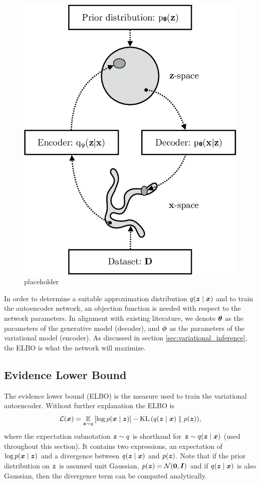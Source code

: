 \begin{figure}[H]
    \centering
    \includegraphics[width=0.6\linewidth]{report/figures/placeholder2.png}
    \caption{placeholder }
\end{figure}

In order to determine a suitable approximation distribution $q(\bm{ z } \mid \bm{ x })$ and to train the autoencoder network, an objection function is needed with respect to the network parameters. In alignment with existing literature, we denote $\bm{ \theta }$ as the parameters of the generative model (decoder), and $\bm{ \phi }$ as the parameters of the variational model (encoder). As discussed in section \ref{sec:variational_inference}, the ELBO is what the network will maximize.

\subsection{Evidence Lower Bound}
\label{sec:elbo}
The evidence lower bound (ELBO) is the measure used to train the variational autoencoder. Without further explanation the ELBO is
\begin{equation}
    \mathcal{L}(\bm{ x }) = \operatorname*{\mathbb{E}}_{\bm{ z }\sim q}{\mathopen{} \left[ \log p(\bm{ x } \mid \bm{ z }) \right] \mathclose{}} - \operatorname{KL}{\mathopen{} \left(q(\bm{ z } \mid \bm{ x }) \parallel p(\bm{ z })\right) \mathclose{}}\label{eq:elbo},
\end{equation}
where the expectation subnotation $\bm{ z } \sim q$ is shorthand for $\bm{ z } \sim q(\bm{ z } \mid \bm{ x })$ (used throughout this section). It contains two expressions, an expectation of $\log p(\bm{ x } \mid \bm{ z })$ and a divergence between $q(\bm{ z } \mid \bm{ x })$ and $p(\bm{ z })$. Note that if the prior distribution on $\bm{ z }$ is assumed unit Gaussian, $p(\bm{ z }) = \mathcal{N}(\bm{ 0 }, \bm{ I })$ and if $q(\bm{ z } \mid \bm{ x })$ is also Gaussian, then the divergence term can be computed analytically.

